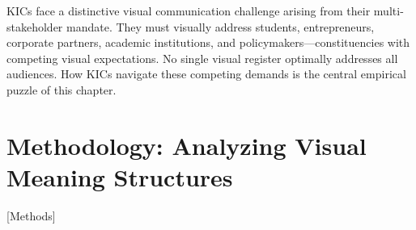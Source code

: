 \documentclass[../main.tex]{subfiles}
\begin{document}
KICs face a distinctive visual communication challenge arising from their multi-stakeholder mandate. They must visually address students, entrepreneurs, corporate partners, academic institutions, and policymakers---constituencies with competing visual expectations. No single visual register optimally addresses all audiences. How KICs navigate these competing demands is the central empirical puzzle of this chapter.

\section{Methodology: Analyzing Visual Meaning Structures}[Methods]
\end{document}
